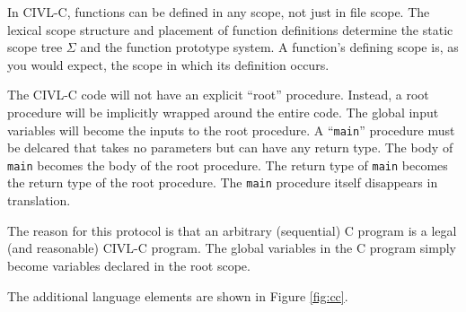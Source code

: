 \documentclass[11pt]{book}
\begin{document}
In CIVL-C, functions can be defined in any scope, not just in file
scope.  The lexical scope structure and placement of function
definitions determine the static scope tree $\Sigma$ and the function
prototype system.  A function's defining scope is, as you would
expect, the scope in which its definition occurs.

The CIVL-C code will not have an explicit ``root'' procedure.
Instead, a root procedure will be implicitly wrapped around the entire
code.  The global input variables will become the inputs to the root
procedure.  A ``\texttt{main}'' procedure must be delcared that takes
no parameters but can have any return type.  The body of \texttt{main}
becomes the body of the root procedure.  The return type of
\texttt{main} becomes the return type of the root procedure.  The
\texttt{main} procedure itself disappears in translation.

The reason for this protocol is that an arbitrary (sequential) C program
is a legal (and reasonable) CIVL-C program.  The global variables in the
C program simply become variables declared in the root scope.

The additional language elements are shown in Figure \ref{fig:cc}.
\end{document}
